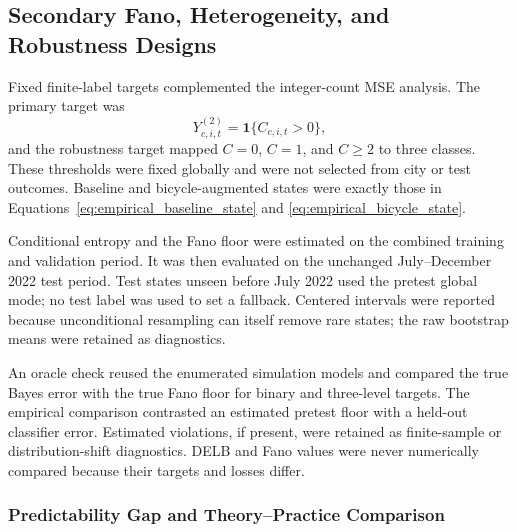 \subsection{Secondary Fano, Heterogeneity, and Robustness Designs}
\label{subsec:fano_validation_methods}

Fixed finite-label targets complemented the integer-count MSE analysis. The
primary target was
\[
Y^{(2)}_{c,i,t}=\mathbf 1\{C_{c,i,t}>0\},
\]
and the robustness target mapped \(C=0\), \(C=1\), and \(C\geq2\) to three
classes. These thresholds were fixed globally and were not selected from
city or test outcomes. Baseline and bicycle-augmented states were exactly those
in Equations~\eqref{eq:empirical_baseline_state} and
\eqref{eq:empirical_bicycle_state}.

Conditional entropy and the Fano floor were estimated on the combined
training and validation period.  It was then evaluated on the unchanged
July--December 2022 test period. Test states
unseen before July 2022 used the pretest global mode; no test label was used
to set a fallback.  Centered intervals were reported because
unconditional resampling can itself remove rare states; the raw bootstrap
means were retained as diagnostics.

An oracle check reused the enumerated simulation models and compared the
true Bayes error with the true Fano floor for binary and three-level targets.
The empirical comparison contrasted an estimated pretest floor with a held-out
classifier error. Estimated violations, if present, were retained as
finite-sample or distribution-shift diagnostics. DELB and Fano values were
never numerically compared because their targets and losses differ.

\subsubsection{Predictability Gap and Theory--Practice Comparison}
\label{subsec:gap_methods}
\label{subsec:gap_efficiency}

